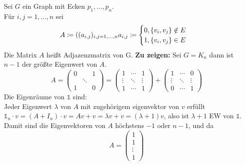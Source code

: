 \begin{problem*}[3]
Sei $ G $ ein Graph mit Ecken $p_1, \dots , p_n$. \\
Für $i,j = 1, \dots , n$ sei 
\begin{equation*}
  A \coloneqq ((a_{ i,j })_{ i,j = 1,\dots, n } \\
   a_{ i,j } \coloneqq 
  \begin{cases}
  0 , \{ v_i, v_j \} \notin E \\
  1 , \{ v_i, v_j \} \in E
    
  \end{cases}
\end{equation*}
Die Matrix $ A $ heißt Adjazenzmatrix von G.
\textbf{Zu zeigen:} Sei $ G = K_n $ dann ist $ n-1 $ der größte Eigenwert von $ A $.\\
\begin{equation*}
  A = \begin{pmatrix}
  0   &   & 1 \\
  &\ddots & \\
  1   & & 0
  \end{pmatrix} = 
  \begin{pmatrix}
  1 & \cdots & 1 \\
  \vdots & \ddots & \vdots \\
  1   & \cdots & 1
  \end{pmatrix} + 
  \begin{pmatrix}
  1 & \cdots & 0 \\
  \vdots & \ddots & \vdots \\
  0   & \cdots & 1
  \end{pmatrix}
\end{equation*}
Die Eigenräume von $ \mathbb{1} $ sind:
\begin{equation*}
 \end{equation*} 
 Jeder Eigenwert $ \lambda $ von $ A $ mit zugehörigem eigenvektor von $ v $ erfüllt\\
 $\mathbb{1}_n \cdot v = (A + I_n) \cdot v = Av + v = \lambda v + v = (\lambda + 1)v$, also ist $ \lambda +1 $ EW von $\mathbb{1}$. \\
 Damit sind die Eigenvektoren von $ A $ höchstens $ -1 $ oder $ n-1 $, und da 
 \begin{equation*}
   A = \begin{pmatrix}
   1 \\
   1 \\
   \vdots \\
   1
     

\end{pmatrix}
\end{equation*}
\end{problem*}
